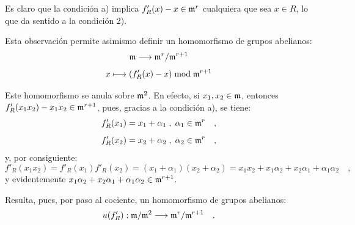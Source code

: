 Es claro que la condición a) implica $f'_R(x) - x \in \mathfrak m^r$ cualquiera que sea $x \in R$, lo que da sentido a la condición 2).

Esta observación permite asimismo definir un homomorfismo de grupos abelianos:
\[
\mathfrak m \longrightarrow \mathfrak m^r/\mathfrak m^{r+1}
\]
\[
x \longmapsto (f'_R(x) - x) \bmod \mathfrak m^{r+1}
\]

Este homomorfismo se anula sobre $\mathfrak m^2$. En efecto, si $x_1, x_2 \in \mathfrak m$, entonces $f'_R(x_1x_2) - x_1x_2 \in \mathfrak m^{r+1}$, pues, gracias a la condición a), se tiene:
\[
f'_R(x_1) = x_1 + \alpha_1 \; , \; \alpha_1 \in \mathfrak m^r \quad ,
\]
\[
f'_R(x_2) = x_2 + \alpha_2 \; , \; \alpha_2 \in \mathfrak m^r \quad ,
\]
y, por consiguiente:
\[
f'_R(x_1x_2) = f'_R(x_1)f'_R(x_2) = (x_1 + \alpha_1)(x_2 + \alpha_2) = x_1x_2 + x_1\alpha_2 + x_2\alpha_1 + \alpha_1\alpha_2 \quad ,
\]
y evidentemente $x_1\alpha_2 + x_2\alpha_1 + \alpha_1\alpha_2 \in \mathfrak m^{r+1}$.

Resulta, pues, por paso al cociente, un homomorfismo de grupos abelianos:
\[
u(f'_R) : \mathfrak m/\mathfrak m^2 \longrightarrow \mathfrak m^r/\mathfrak m^{r+1} \quad .
\]
